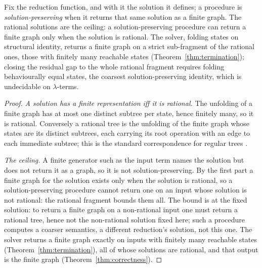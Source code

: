 \begin{theorem}\label{thm:ceiling}
  Fix the reduction function, and with it the solution it defines; a procedure is
  \emph{solution-preserving} when it returns that same solution as a finite graph. The rational solutions are the ceiling: a solution-preserving procedure can return a finite graph only when the solution is rational. The solver, folding states on structural identity, returns a finite graph on a strict sub-fragment of the rational ones, those with finitely many reachable states (Theorem~\ref{thm:termination}); closing the residual gap to the whole rational fragment requires folding behaviourally equal states, the coarsest solution-preserving identity, which is undecidable on $\lambda$-terms.
\end{theorem}
\begin{proof}
  \emph{A solution has a finite representation iff it is rational.} The unfolding of a finite graph has at most one distinct subtree per state, hence finitely many, so it is rational.
  Conversely a rational tree is the unfolding of the finite graph whose states are its distinct subtrees, each carrying its root operation with an edge to each immediate subtree; this is the standard correspondence for regular trees \cite{courcelle1983-infinite-trees}.

  \emph{The ceiling.} A finite generator such as the input term names the solution but does not return it as a graph, so it is not solution-preserving. By the first part a finite graph for the solution exists only when the solution is rational, so a solution-preserving procedure cannot return one on an input whose solution is not rational: the rational fragment bounds them all. The bound is at the fixed solution: to return a finite graph on a non-rational input one must return a rational tree, hence not the non-rational solution fixed here; such a procedure computes a coarser semantics, a different reduction's solution, not this one. The solver returns a finite graph exactly on inputs with finitely many reachable states (Theorem~\ref{thm:termination}), all of whose solutions are rational, and that output is the finite graph (Theorem~\ref{thm:correctness}).


\end{proof}
